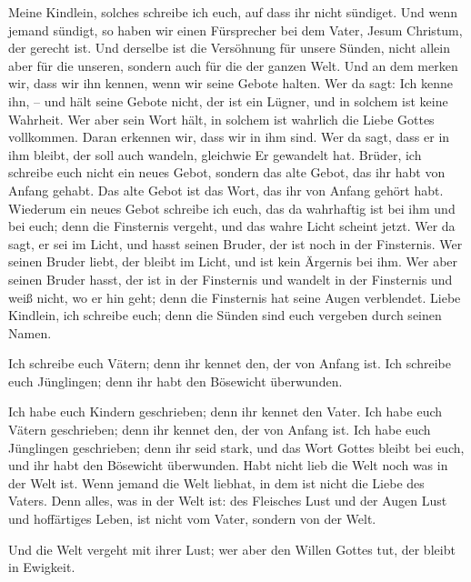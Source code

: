  Meine Kindlein, solches schreibe ich euch, auf dass ihr
nicht sündiget. Und wenn jemand sündigt, so haben wir einen Fürsprecher
bei dem Vater, Jesum Christum, der gerecht ist.  Und
derselbe ist die Versöhnung für unsere Sünden, nicht allein aber für die
unseren, sondern auch für die der ganzen Welt.  Und an dem
merken wir, dass wir ihn kennen, wenn wir seine Gebote halten.
 Wer da sagt: Ich kenne ihn, -- und hält seine Gebote
nicht, der ist ein Lügner, und in solchem ist keine Wahrheit.
 Wer aber sein Wort hält, in solchem ist wahrlich die
Liebe Gottes vollkommen. Daran erkennen wir, dass wir in ihm sind.
 Wer da sagt, dass er in ihm bleibt, der soll auch
wandeln, gleichwie Er gewandelt hat.  Brüder, ich schreibe
euch nicht ein neues Gebot, sondern das alte Gebot, das ihr habt von
Anfang gehabt. Das alte Gebot ist das Wort, das ihr von Anfang gehört
habt.  Wiederum ein neues Gebot schreibe ich euch, das da
wahrhaftig ist bei ihm und bei euch; denn die Finsternis vergeht, und
das wahre Licht scheint jetzt.  Wer da sagt, er sei im
Licht, und hasst seinen Bruder, der ist noch in der Finsternis.
 Wer seinen Bruder liebt, der bleibt im Licht, und ist
kein Ärgernis bei ihm.  Wer aber seinen Bruder hasst, der
ist in der Finsternis und wandelt in der Finsternis und weiß nicht, wo
er hin geht; denn die Finsternis hat seine Augen verblendet.
 Liebe Kindlein, ich schreibe euch; denn die Sünden sind
euch vergeben durch seinen Namen.

 Ich schreibe euch Vätern; denn ihr kennet den, der von
Anfang ist. Ich schreibe euch Jünglingen; denn ihr habt den Bösewicht
überwunden.

 Ich habe euch Kindern geschrieben; denn ihr kennet den
Vater. Ich habe euch Vätern geschrieben; denn ihr kennet den, der von
Anfang ist. Ich habe euch Jünglingen geschrieben; denn ihr seid stark,
und das Wort Gottes bleibt bei euch, und ihr habt den Bösewicht
überwunden.  Habt nicht lieb die Welt noch was in der
Welt ist. Wenn jemand die Welt liebhat, in dem ist nicht die Liebe des
Vaters.  Denn alles, was in der Welt ist: des Fleisches
Lust und der Augen Lust und hoffärtiges Leben, ist nicht vom Vater,
sondern von der Welt.

 Und die Welt vergeht mit ihrer Lust; wer aber den Willen
Gottes tut, der bleibt in Ewigkeit.

